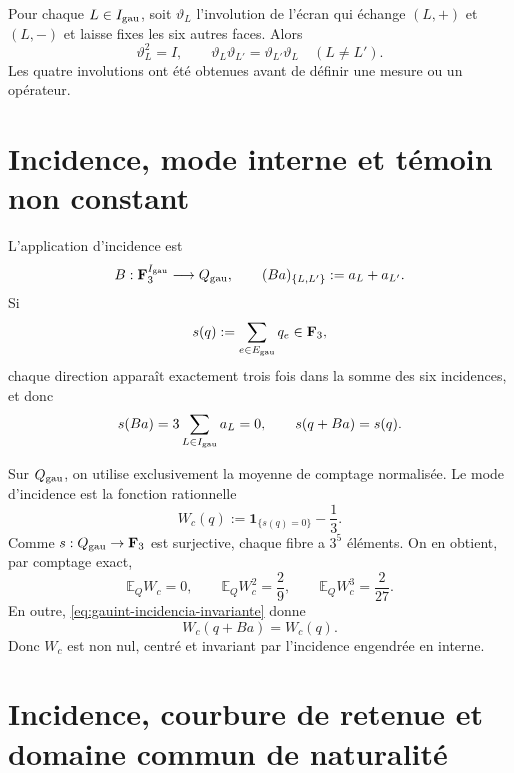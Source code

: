 Pour chaque \(L\in I_{\rm gau}\), soit \(\vartheta_L\) l'involution de
l'écran qui échange \((L,+)\) et \((L,-)\) et laisse fixes les six autres
faces. Alors
\begin{equation}\label{eq:gauint-cuatro-involuciones}
 \vartheta_L^2=I,
 \qquad
 \vartheta_L\vartheta_{L'}=\vartheta_{L'}\vartheta_L
 \quad(L\ne L').
\end{equation}
Les quatre involutions ont été obtenues avant de définir une mesure ou un opérateur.

\section{Incidence, mode interne et témoin non constant}

L'application d'incidence est
\begin{equation}\label{eq:gauint-incidencia-b}
 B:\mathbf F_3^{I_{\rm gau}}\longrightarrow Q_{\rm gau},
 \qquad
 (Ba)_{\{L,L'\}}:=a_L+a_{L'}.
\end{equation}
Si
\[
 s(q):=\sum_{e\in E_{\rm gau}}q_e\in\mathbf F_3,
\]
chaque direction apparaît exactement trois fois dans la somme des six
incidences, et donc
\begin{equation}\label{eq:gauint-incidencia-invariante}
 s(Ba)=3\sum_{L\in I_{\rm gau}}a_L=0,
 \qquad
 s(q+Ba)=s(q).
\end{equation}

Sur \(Q_{\rm gau}\), on utilise exclusivement la moyenne de comptage
normalisée. Le mode d'incidence est la fonction rationnelle
\begin{equation}\label{eq:gauint-wc-definicion}
 W_c(q):=\mathbf 1_{\{s(q)=0\}}-\frac13.
\end{equation}
Comme \(s:Q_{\rm gau}\to\mathbf F_3\) est surjective, chaque fibre a
\(3^5\) éléments. On en obtient, par comptage exact,
\begin{equation}\label{eq:gauint-wc-momentos}
 \mathbb E_{Q}W_c=0,
 \qquad
 \mathbb E_{Q}W_c^2=\frac29,
 \qquad
 \mathbb E_{Q}W_c^3=\frac{2}{27}.
\end{equation}
En outre, \eqref{eq:gauint-incidencia-invariante} donne
\begin{equation}\label{eq:gauint-wc-invariancia}
 W_c(q+Ba)=W_c(q).
\end{equation}
Donc \(W_c\) est non nul, centré et invariant par l'incidence
engendrée en interne.

\fi
\section{Incidence, courbure de retenue et domaine commun de naturalité}

